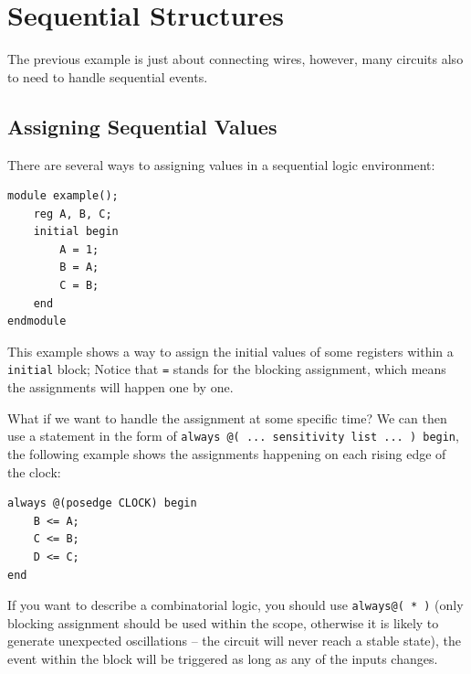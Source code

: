 \documentclass[a4paper,12pt, oneside]{book}
\begin{document}
\section{Sequential Structures}
The previous example is just about connecting wires, however, many circuits also to need to handle sequential events.
\subsection{Assigning Sequential Values}
There are several ways to assigning values in a sequential logic environment:
\begin{verbatim}
module example();
    reg A, B, C;
    initial begin
        A = 1;
        B = A;
        C = B;
    end
endmodule
\end{verbatim}
This example shows a way to assign the initial values of some registers within a \texttt{initial} block; Notice that \texttt{=} stands for the blocking assignment, which means the assignments will happen one by one.

What if we want to handle the assignment at some specific time? We can then use a statement in the form of \texttt{always @( ...  sensitivity  list  ... ) begin}, the following example shows the assignments happening on each rising edge of the clock:
\begin{verbatim}
always @(posedge CLOCK) begin
    B <= A;
    C <= B;
    D <= C;
end
\end{verbatim}
If you want to describe a combinatorial logic, you should use \texttt{always@( * )} (only blocking assignment should be used within the scope, otherwise it is likely to generate unexpected oscillations -- the circuit will never reach a stable state), the event within the block will be triggered as long as any of the inputs changes.
\end{document}

